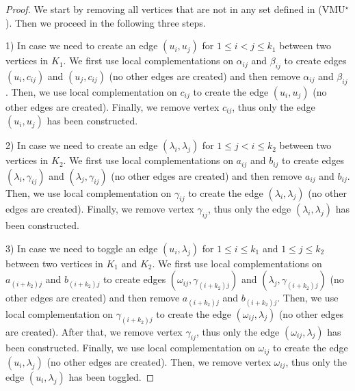 \documentclass[10pt,a4paper]{article}
\newcommand{\ls}{\leqslant}
\begin{document}
\begin{proof}
      We start by removing all vertices that are not in any set defined in (VMU$^\star$). Then we proceed in the following three steps. 
      
      1) In case we need to create an edge $(u_i, u_j)$ for $1 \ls i < j \ls k_1$ between two vertices in $K_1$.  We first use local complementations on $\alpha_{ij}$ and $\beta_{ij}$ to create  edges $(u_i,c_{ij})$ and $(u_j, c_{ij})$ (no other edges are created) and then remove $\alpha_{ij}$ and $\beta_{ij}$. Then, we use local complementation on $c_{ij}$ to create the edge $(u_i, u_j)$ (no other edges are created). Finally, we remove vertex $c_{ij}$, thus only the edge $(u_i, u_j)$ has been constructed. 
      
    2)  In case we need to create an edge $(\lambda_i, \lambda_j)$ for $1 \ls j < i \ls k_2$ between two vertices in $K_2$. We first use local complementations on $a_{ij}$ and $b_{ij}$ to create edges $(\lambda_i,\gamma_{ij})$ and $(\lambda_j, \gamma_{ij})$ (no other edges are created) and then remove $a_{ij}$ and $b_{ij}$. Then, we use local complementation on $\gamma_{ij}$ to create the edge $(\lambda_i, \lambda_j)$ (no other edges are created). Finally, we remove vertex $\gamma_{ij}$, thus only the edge $(\lambda_i, \lambda_j)$ has been constructed. 
      
    3)  In case we need to toggle an edge $(u_i, \lambda_j)$ for $1 \ls i \ls k_1$ and $1\ls j \ls k_2$ between two vertices in $K_1$ and $K_2$. We first use local complementations on $a_{(i+k_2)j}$ and $b_{(i+k_2)j}$ to create edges $(\omega_{ij}, \gamma_{(i+k_2)j})$ and $(\lambda_j, \gamma_{(i+k_2)j})$ (no other edges are created) and then remove $a_{(i+k_2)j}$ and $b_{(i+k_2)j}$. Then, we use local complementation on $\gamma_{(i+k_2)j}$ to create the edge $(\omega_{ij}, \lambda_j)$ (no other edges are created). After that, we remove vertex $\gamma_{ij}$, thus only the edge $(\omega_{ij}, \lambda_j)$ has been constructed. Finally, we use local complementation on $\omega_{ij}$ to create the edge $(u_i, \lambda_j)$ (no other edges are created). Then, we remove vertex $\omega_{ij}$, thus only the edge $(u_i, \lambda_j)$ has been toggled.
\end{proof}
\end{document}
